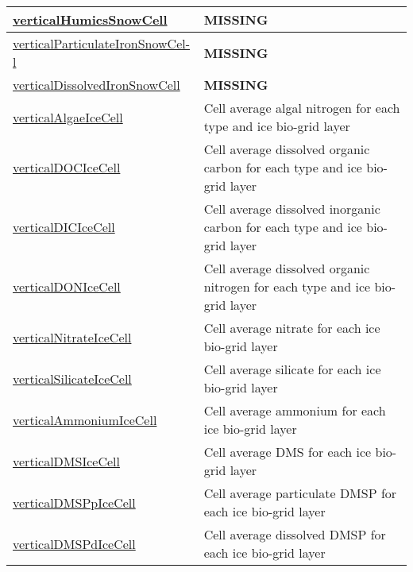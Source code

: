{\begin{center}
\begin{longtable}{| p{2.0in} | p{4.0in} |}
    \hline
    \hyperref[subsec:var_sec_tracers_aggregate_verticalHumicsSnowCell]{verticalHumicsSnowCell} & {\bf \color{red} MISSING} \\
    \hline
    \hyperref[subsec:var_sec_tracers_aggregate_verticalParticulateIronSnowCell]{verticalParticulateIronSnowCel-}\hyperref[subsec:var_sec_tracers_aggregate_verticalParticulateIronSnowCell]{l  }& {\bf \color{red} MISSING} \\
    \hline
    \hyperref[subsec:var_sec_tracers_aggregate_verticalDissolvedIronSnowCell]{verticalDissolvedIronSnowCell} & {\bf \color{red} MISSING} \\
    \hline
    \hyperref[subsec:var_sec_tracers_aggregate_verticalAlgaeIceCell]{verticalAlgaeIceCell} & Cell average algal nitrogen for each type and ice bio-grid layer \\
    \hline
    \hyperref[subsec:var_sec_tracers_aggregate_verticalDOCIceCell]{verticalDOCIceCell} & Cell average dissolved organic carbon for each type and ice bio-grid layer \\
    \hline
    \hyperref[subsec:var_sec_tracers_aggregate_verticalDICIceCell]{verticalDICIceCell} & Cell average dissolved inorganic carbon for each type and ice bio-grid layer \\
    \hline
    \hyperref[subsec:var_sec_tracers_aggregate_verticalDONIceCell]{verticalDONIceCell} & Cell average dissolved organic nitrogen for each type and ice bio-grid layer \\
    \hline
    \hyperref[subsec:var_sec_tracers_aggregate_verticalNitrateIceCell]{verticalNitrateIceCell} & Cell average nitrate for each ice bio-grid layer \\
    \hline
    \hyperref[subsec:var_sec_tracers_aggregate_verticalSilicateIceCell]{verticalSilicateIceCell} & Cell average silicate for each ice bio-grid layer \\
    \hline
    \hyperref[subsec:var_sec_tracers_aggregate_verticalAmmoniumIceCell]{verticalAmmoniumIceCell} & Cell average ammonium for each ice bio-grid layer \\
    \hline
    \hyperref[subsec:var_sec_tracers_aggregate_verticalDMSIceCell]{verticalDMSIceCell} & Cell average DMS for each ice bio-grid layer \\
    \hline
    \hyperref[subsec:var_sec_tracers_aggregate_verticalDMSPpIceCell]{verticalDMSPpIceCell} & Cell average particulate DMSP for each ice bio-grid layer \\
    \hline
    \hyperref[subsec:var_sec_tracers_aggregate_verticalDMSPdIceCell]{verticalDMSPdIceCell} & Cell average dissolved DMSP for each ice bio-grid layer \\

\end{longtable}
\end{center}}
